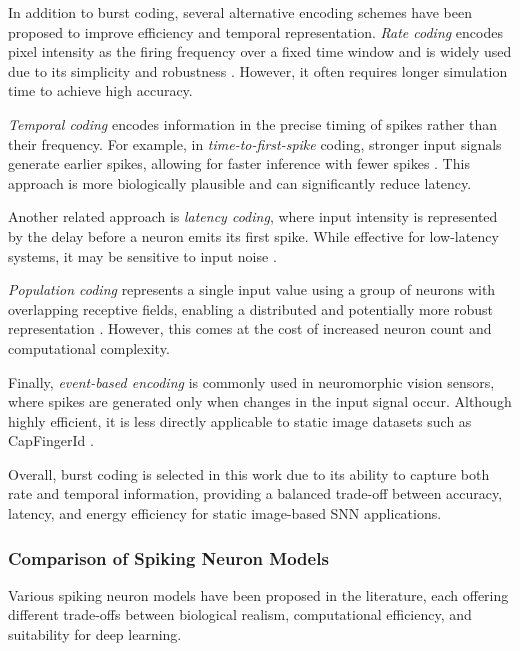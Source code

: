 \documentclass[../main.tex]{subfiles}
\begin{document}
In addition to burst coding, several alternative encoding schemes have been proposed to improve efficiency and temporal representation. \textit{Rate coding} encodes pixel intensity as the firing frequency over a fixed time window and is widely used due to its simplicity and robustness \cite{Gerstner_Kistler_2002, diehl2015unsupervised}. However, it often requires longer simulation time to achieve high accuracy.

\textit{Temporal coding} encodes information in the precise timing of spikes rather than their frequency. For example, in \textit{time-to-first-spike} coding, stronger input signals generate earlier spikes, allowing for faster inference with fewer spikes \cite{thorpe2001spike, masquelier2007unsupervised}. This approach is more biologically plausible and can significantly reduce latency.

Another related approach is \textit{latency coding}, where input intensity is represented by the delay before a neuron emits its first spike. While effective for low-latency systems, it may be sensitive to input noise \cite{bohte2002error}.

\textit{Population coding} represents a single input value using a group of neurons with overlapping receptive fields, enabling a distributed and potentially more robust representation \cite{eliassmith2003neural}. However, this comes at the cost of increased neuron count and computational complexity.

Finally, \textit{event-based encoding} is commonly used in neuromorphic vision sensors, where spikes are generated only when changes in the input signal occur. Although highly efficient, it is less directly applicable to static image datasets such as CapFingerId \cite{gallego2020event}.

Overall, burst coding is selected in this work due to its ability to capture both rate and temporal information, providing a balanced trade-off between accuracy, latency, and energy efficiency for static image-based SNN applications.

\subsubsection{Comparison of Spiking Neuron Models}

Various spiking neuron models have been proposed in the literature, each offering different trade-offs between biological realism, computational efficiency, and suitability for deep learning.
\end{document}

